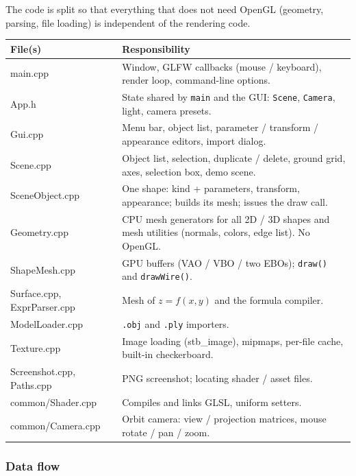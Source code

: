 \documentclass[a4paper, 11pt]{article}
\newcommand{\code}[1]{\texttt{#1}}
\begin{document}
The code is split so that everything that does not need OpenGL (geometry, parsing, file loading) is
independent of the rendering code.

\begin{center}
\small
\begin{tabularx}{\textwidth}{@{}>{\ttfamily}l X@{}}
\toprule
\textnormal{\textbf{File(s)}} & \textbf{Responsibility}\\
\midrule
main.cpp & Window, GLFW callbacks (mouse / keyboard), render loop, command-line options.\\
App.h & State shared by \code{main} and the GUI: \code{Scene}, \code{Camera}, light, camera presets.\\
Gui.cpp & Menu bar, object list, parameter / transform / appearance editors, import dialog.\\
Scene.cpp & Object list, selection, duplicate / delete, ground grid, axes, selection box, demo scene.\\
SceneObject.cpp & One shape: kind + parameters, transform, appearance; builds its mesh; issues the draw call.\\
Geometry.cpp & CPU mesh generators for all 2D / 3D shapes and mesh utilities (normals, colors, edge list). No OpenGL.\\
ShapeMesh.cpp & GPU buffers (VAO / VBO / two EBOs); \code{draw()} and \code{drawWire()}.\\
Surface.cpp, ExprParser.cpp & Mesh of $z=f(x,y)$ and the formula compiler.\\
ModelLoader.cpp & \code{.obj} and \code{.ply} importers.\\
Texture.cpp & Image loading (stb\_image), mipmaps, per-file cache, built-in checkerboard.\\
Screenshot.cpp, Paths.cpp & PNG screenshot; locating shader / asset files.\\
common/Shader.cpp & Compiles and links GLSL, uniform setters.\\
common/Camera.cpp & Orbit camera: view / projection matrices, mouse rotate / pan / zoom.\\
\bottomrule
\end{tabularx}
\end{center}

\subsubsection{Data flow}
\end{document}
